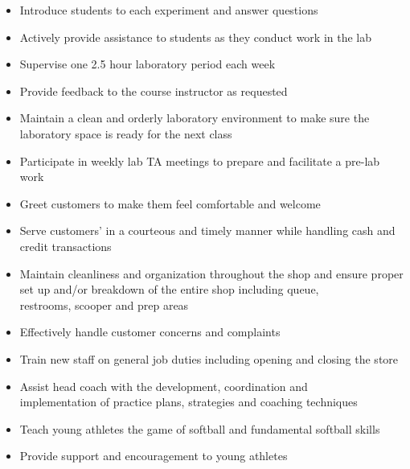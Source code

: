 \documentclass[10pt,letter,ragged2e,withhyper]{altacv}
\begin{document}
\begin{paracol}{2}

\begin{itemize}
\item Introduce students to each experiment and answer questions
\item Actively provide assistance to students as they conduct work in the lab
\item Supervise one 2.5 hour laboratory period each week
\item Provide feedback to the course instructor as requested
\item Maintain a clean and orderly laboratory environment to make sure the laboratory space is ready for the next class
\item Participate in weekly lab TA meetings to prepare and facilitate a pre-lab work
\end{itemize}

\divider

\begin{itemize}
\item Greet customers to make them feel comfortable and welcome
\item Serve customers’ in a courteous and timely manner while handling cash and credit transactions
\item Maintain cleanliness and organization throughout the shop and ensure proper set up and/or breakdown of the entire shop including queue,\\ restrooms, scooper and prep areas
\item Effectively handle customer concerns and complaints
\item Train new staff on general job duties including opening and closing the store
\end{itemize}

\divider

\begin{itemize}
\item Assist head coach with the development, coordination and \\ implementation of practice plans, strategies and coaching techniques  
\item Teach young athletes the game of softball and fundamental softball skills
\item Provide support and encouragement to young athletes
\end{itemize}


\end{paracol}
\end{document}
